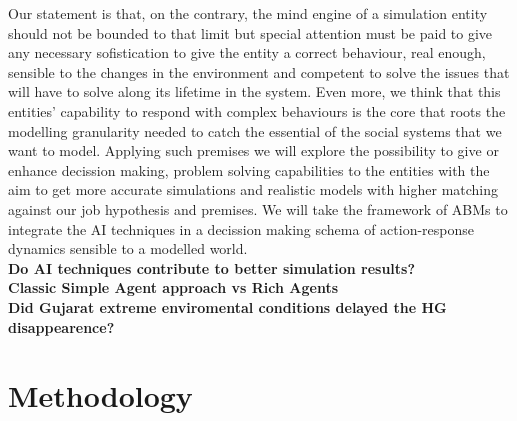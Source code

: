 \documentclass[11pt,oneside,a4paper,openright]{report}
\begin{document}
Our statement is that, on the contrary, the mind engine of a simulation entity should not be bounded to that limit but special attention must be paid to give any necessary sofistication to give the entity a correct behaviour, real enough, sensible to the changes in the environment and competent to solve the issues that will have to solve along its lifetime in the system. Even more, we think that this entities' capability to respond with complex behaviours is the core that roots the modelling granularity needed to catch the essential of the social systems that we want to model.
Applying such premises we will explore the possibility to give or enhance decission making, problem solving
capabilities to the entities with the aim to get more accurate simulations and realistic models with higher matching against our job hypothesis and premises. We will take the framework of ABMs to integrate the AI techniques in a decission making schema of action-response dynamics sensible to a modelled world.\\



\indent \textbf{Do AI techniques contribute to better simulation results?}\\
\indent \textbf{Classic Simple Agent approach vs Rich Agents}\\
\indent \textbf{Did Gujarat extreme enviromental conditions delayed the HG disappearence?}\\
\newpage 
\chapter{Methodology}


\end{document}
